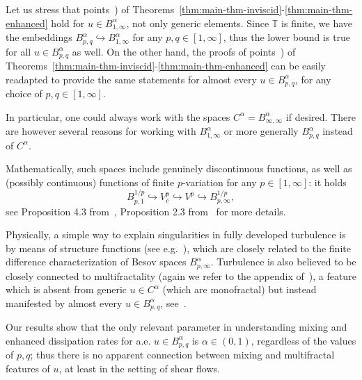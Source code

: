 \documentclass[11pt,oneside,reqno]{amsart}
\newcommand{\tmtextit}[1]{\text{{\itshape{#1}}}}
\numberwithin{equation}{section}
\begin{document}
\begin{remark}
  \label{rem:intro}Let us stress that points~\tmtextit{a}) of
  Theorems~\ref{thm:main-thm-inviscid}-\ref{thm:main-thm-enhanced} hold for
  \tmtextit{all} $u \in B^{\alpha}_{1, \infty}$, not only generic elements.
  Since $\mathbb{T}$ is finite, we have the embeddings $B^{\alpha}_{p, q}
  \hookrightarrow B^{\alpha}_{1, \infty}$ for any $p, q \in [1, \infty]$, thus
  the lower bound is true for all $u \in B^{\alpha}_{p, q}$ as well. On the
  other hand, the proofs of points~\tmtextit{b}) of
  Theorems~\ref{thm:main-thm-inviscid}-\ref{thm:main-thm-enhanced} can be
  easily readapted to provide the same statements for almost every $u \in
  B^{\alpha}_{p, q}$, for any choice of $p, q \in [1, \infty]$.
  
  In particular, one could always work with the spaces $C^{\alpha} =
  B^{\alpha}_{\infty, \infty}$ if desired. There are however several reasons
  for working with $B^{\alpha}_{1, \infty}$ or more generally $B^{\alpha}_{p,
  q}$ instead of $C^{\alpha}$.
  
  Mathematically, such spaces include genuinely discontinuous functions, as
  well as (possibly continuous) functions of finite $p$-variation for any $p
  \in [1, \infty]$: it holds
  \[ B^{1 / p}_{p, 1} \hookrightarrow V^p_c \hookrightarrow V^p
     \hookrightarrow B^{1 / p}_{p, \infty}, \]
  see Proposition 4.3 from~{\cite{liu2020}}, Proposition 2.3
  from~{\cite{friz2021}} for more details.
  
  Physically, a simple way to explain singularities in fully developed
  turbulence is by means of structure functions (see
  e.g.~{\cite{frisch1980}}), which are closely related to the finite
  difference characterization of Besov spaces $B^{\alpha}_{p, \infty}$.
  Turbulence is also believed to be closely connected to multifractality
  (again we refer to the appendix of~{\cite{frisch1980}}), a feature which is
  absent from generic $u \in C^{\alpha}$ (which are monofractal) but instead
  manifested by almost every $u \in B^{\alpha}_{p, q}$,
  see~{\cite{jaffard2000,fraysse2006,fraysse2010}}.
  
  Our results show that the only relevant parameter in understanding mixing
  and enhanced dissipation rates for a.e. $u \in B^{\alpha}_{p, q}$ is $\alpha
  \in (0, 1)$, regardless of the values of $p, q$; thus there is no apparent
  connection between mixing and multifractal features of $u$, at
  least in the setting of shear flows.
\end{remark}
\end{document}
